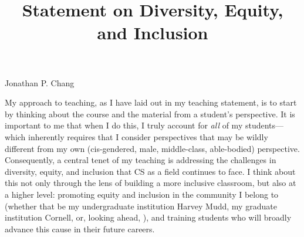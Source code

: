 \documentclass[12pt,letterpaper]{article}
\title{Statement on Diversity, Equity, and Inclusion}
\begin{document}
\maketitle

{\centering Jonathan P. Chang \par}

\vspace{0.5\baselineskip}

My approach to teaching, as I have laid out in my teaching statement, is to start by thinking about the course and the material from a student's perspective.
It is important to me that when I do this, I truly account for \emph{all} of my students---which inherently requires that I consider perspectives that may be wildly different from my own (cis-gendered, male, middle-class, able-bodied) perspective.
Consequently, a central tenet of my teaching is addressing the challenges in diversity, equity, and inclusion that CS as a field continues to face.
I think about this not only through the lens of building a more inclusive classroom, but also at a higher level: promoting equity and inclusion in the community I belong to (whether that be my undergraduate institution Harvey Mudd, my graduate institution Cornell, or, looking ahead, \schoolname), and training students who will broadly advance this cause in their future careers.
\end{document}
